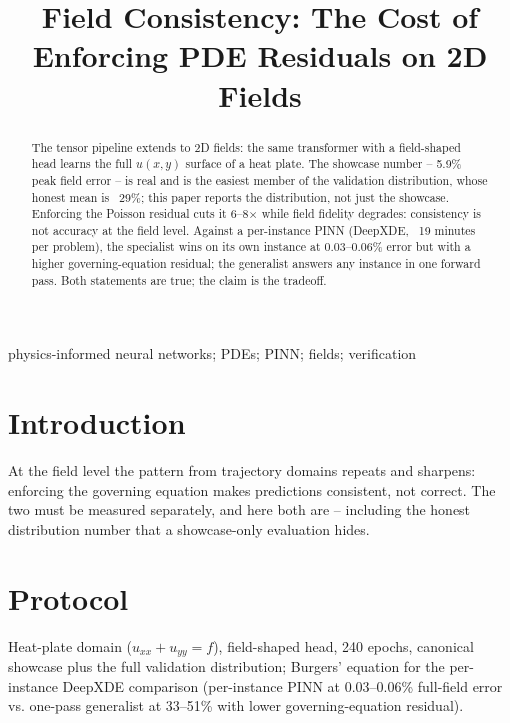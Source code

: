 \documentclass[conference,10pt]{IEEEtran}
\begin{document}
\title{Field Consistency: The Cost of Enforcing PDE Residuals on 2D Fields}

\author{
}

\maketitle

\begin{abstract}
The tensor pipeline extends to 2D fields: the same transformer with a field-shaped head learns the full $u(x,y)$ surface of a heat plate. The showcase number -- 5.9\% peak field error -- is real and is the easiest member of the validation distribution, whose honest mean is ~29\%; this paper reports the distribution, not just the showcase. Enforcing the Poisson residual cuts it 6--8$\times$ while field fidelity degrades: consistency is not accuracy at the field level. Against a per-instance PINN (DeepXDE, ~19 minutes per problem), the specialist wins on its own instance at 0.03--0.06\% error but with a higher governing-equation residual; the generalist answers any instance in one forward pass. Both statements are true; the claim is the tradeoff.
\end{abstract}

\begin{IEEEkeywords}
physics-informed neural networks; PDEs; PINN; fields; verification
\end{IEEEkeywords}

\section{Introduction}
At the field level the pattern from trajectory domains repeats and sharpens: enforcing the governing equation makes predictions consistent, not correct. The two must be measured separately, and here both are -- including the honest distribution number that a showcase-only evaluation hides.

\section{Protocol}
Heat-plate domain ($u_{xx}+u_{yy}=f$), field-shaped head, 240 epochs, canonical showcase plus the full validation distribution; Burgers' equation for the per-instance DeepXDE comparison (per-instance PINN at 0.03--0.06\% full-field error vs. one-pass generalist at 33--51\% with lower governing-equation residual).
\end{document}
